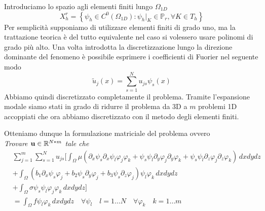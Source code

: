 Introduciamo lo spazio agli elementi finiti lungo $\Omega_{1D}$
\begin{equation}
\label{eq: spazio polinomiale}
X_h^r= \left\{\psi_h \in C^0(\Omega_{1D}): \psi_h \vert_K  \in \mathbb{P}_r,\forall K\in T_h \right\}
\end{equation}
Per semplicit\`a supponiamo di utilizzare elementi finiti di grado uno, ma
la trattazione teorica \`e del tutto equivalente nel caso si volessero usare 
polinomi di grado pi\`u alto.
Una volta introdotta la discretizzazione lungo la direzione dominante 
del fenomeno \`e possibile esprimere i coefficienti di Fuorier 
nel seguente modo
\begin{equation}
\label{eq: coeff fourier espansi}
\tilde{u}_j(x)=\sum_{s=1}^Nu_{js}\psi_s(x)
\end{equation}
Abbiamo quindi discretizzato completamente il problema. Tramite l'espansione modale
siamo stati in grado di ridurre il problema da 3D a $m$ problemi 1D accoppiati che ora
abbiamo discretizzato con il metodo degli elementi finiti.

Otteniamo dunque la formulazione matriciale del problema ovvero\\
\emph{Trovare $\mathbf{u} \in \mathbb{R}^{N*m}$ tale che}
\begin{equation}
\begin{split}
&\sum_{j=1}^m \sum_{s=1}^N
u_{js} \Bigg[ \int_\Omega\mu( \partial_x\psi_s \partial_x\psi_l\varphi _j\varphi _k + \psi_s \psi_l \partial_y\varphi _j\partial_y\varphi _k + \psi_s \psi_l \partial_z\varphi _j\partial_z\varphi _k)\,dxdydz \\
&+ \int_\Omega (b_1\partial_x\psi_s\varphi _j+b_2\psi_s\partial_y\varphi _j + b_3\psi_s\partial_z\varphi_j)\psi_l\varphi _k\,dxdydz\\ 
&+\int_\Omega \sigma\psi_s\psi_l\varphi _j\varphi _k\,dxdydz \Bigg]\\
&=\int_\Omega f\psi_l\varphi _k\,dxdydz\quad \forall \psi_l\quad l=1\ldots N\quad\forall \varphi_k\quad k=1\ldots m
\end{split}
\end{equation}


